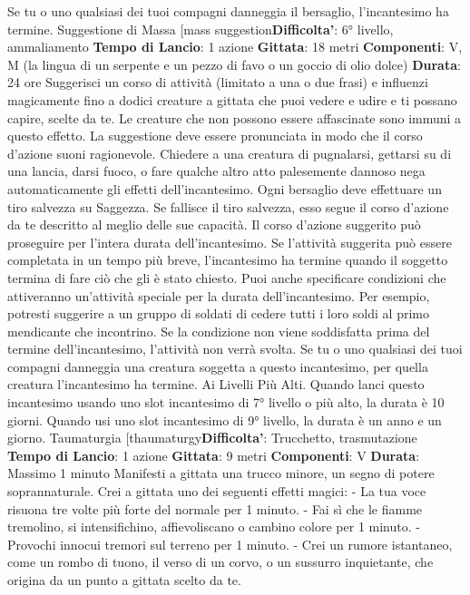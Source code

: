 \begin{multicols}{2}
Se tu o uno qualsiasi dei tuoi compagni danneggia il
bersaglio, l’incantesimo ha termine.
Suggestione di Massa
[mass suggestion\textbf{Difficolta'}:
6° livello, ammaliamento
\textbf{Tempo di Lancio}: 1 azione
\textbf{Gittata}: 18 metri
\textbf{Componenti}: V, M (la lingua di un serpente e un pezzo
di favo o un goccio di olio dolce)
\textbf{Durata}: 24 ore
Suggerisci un corso di attività (limitato a una o due
frasi) e influenzi magicamente fino a dodici creature a
gittata che puoi vedere e udire e ti possano capire,
scelte da te. Le creature che non possono essere
affascinate sono immuni a questo effetto. La
suggestione deve essere pronunciata in modo che il
corso d’azione suoni ragionevole. Chiedere a una
creatura di pugnalarsi, gettarsi su di una lancia, darsi
fuoco, o fare qualche altro atto palesemente dannoso
nega automaticamente gli effetti dell’incantesimo.
Ogni bersaglio deve effettuare un tiro salvezza su
Saggezza. Se fallisce il tiro salvezza, esso segue il
corso d’azione da te descritto al meglio delle sue
capacità. Il corso d’azione suggerito può proseguire per
l’intera durata dell’incantesimo. Se l’attività suggerita
può essere completata in un tempo più breve,
l’incantesimo ha termine quando il soggetto termina di
fare ciò che gli è stato chiesto.
Puoi anche specificare condizioni che attiveranno
un’attività speciale per la durata dell’incantesimo. Per
esempio, potresti suggerire a un gruppo di soldati di
cedere tutti i loro soldi al primo mendicante che
incontrino. Se la condizione non viene soddisfatta prima
del termine dell’incantesimo, l’attività non verrà svolta.
Se tu o uno qualsiasi dei tuoi compagni danneggia una
creatura soggetta a questo incantesimo, per quella
creatura l’incantesimo ha termine.
Ai Livelli Più Alti. Quando lanci questo incantesimo
usando uno slot incantesimo di 7° livello o più alto, la
durata è 10 giorni. Quando usi uno slot incantesimo di
9° livello, la durata è un anno e un giorno.
Taumaturgia
[thaumaturgy\textbf{Difficolta'}:
Trucchetto, trasmutazione
\textbf{Tempo di Lancio}: 1 azione
\textbf{Gittata}: 9 metri
\textbf{Componenti}: V
\textbf{Durata}: Massimo 1 minuto
Manifesti a gittata una trucco minore, un segno di
potere soprannaturale. Crei a gittata uno dei seguenti
effetti magici:
- La tua voce risuona tre volte più forte del normale
per 1 minuto.
- Fai sì che le fiamme tremolino, si intensifichino,
affievoliscano o cambino colore per 1 minuto.
- Provochi innocui tremori sul terreno per 1 minuto.
- Crei un rumore istantaneo, come un rombo di tuono,
il verso di un corvo, o un sussurro inquietante, che
origina da un punto a gittata scelto da te.

\end{multicols}
